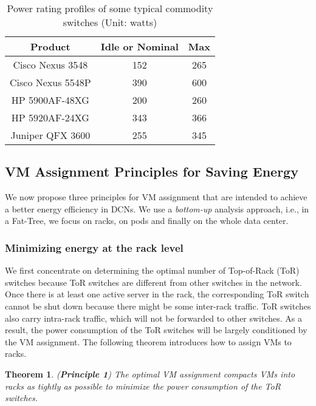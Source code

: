 \documentclass[journal,single-space,two column,twoside,10pt]{IEEEtran}
\newtheorem{theorem}{Theorem}
\begin{document}
\begin{table}[t]
\caption{\label{tab:power} Power rating profiles of some typical commodity switches (Unit: watts)}
\centering
\begin{tabular}{|c|c|c|}
	\hline
	\textbf{Product} & \textbf{Idle or Nominal} & \textbf{Max} \\
	\hline
	Cisco Nexus 3548 & 152 & 265 \\
	\hline
	Cisco Nexus 5548P & 390 & 600 \\
	\hline
	HP 5900AF-48XG & 200 & 260 \\
	\hline
	HP 5920AF-24XG & 343 & 366 \\
	\hline
	Juniper QFX 3600 & 255 & 345 \\
	\hline
\end{tabular}
\end{table}


\subsection{VM Assignment Principles for Saving Energy}
\label{sec:principles}

We now propose three principles for VM assignment that are intended to achieve a better energy efficiency in DCNs. We use a \emph{bottom-up} analysis approach, i.e., in a Fat-Tree, we focus on racks, on pods and finally on the whole data center.

\subsubsection{Minimizing energy at the rack level}

We first concentrate on determining the optimal number of Top-of-Rack (ToR) switches because ToR switches are different from other switches in the network. Once there is at least one active server in the rack, the corresponding ToR switch cannot be shut down because there might be some inter-rack traffic. ToR switches also carry intra-rack traffic, which will not be forwarded to other switches. As a result, the power consumption of the ToR switches will be largely conditioned by the VM assignment. The following theorem introduces how to assign VMs to racks.
\begin{theorem}
\label{theo:princ1}
(\textbf{Principle 1}) The optimal VM assignment compacts VMs into racks as tightly as possible to minimize the power consumption of the ToR switches.
\end{theorem}
\end{document}
